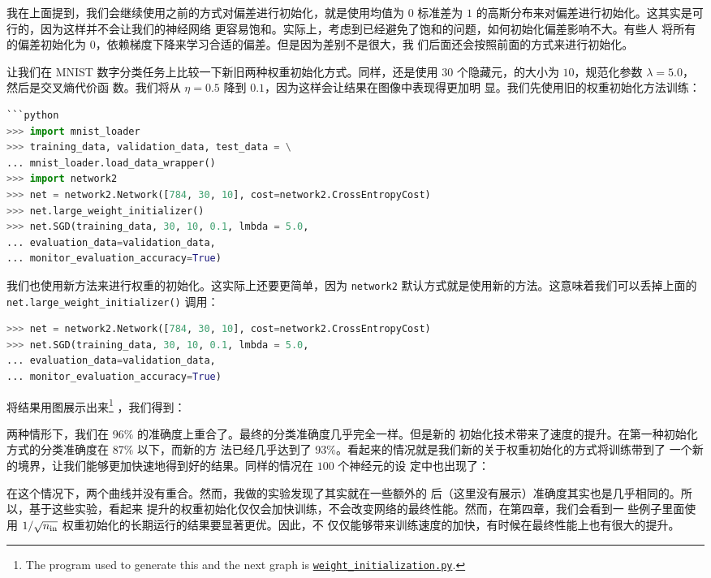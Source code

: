 我在上面提到，我们会继续使用之前的方式对偏差进行初始化，就是使用均值为 $0$ 标准差为
$1$ 的高斯分布来对偏差进行初始化。这其实是可行的，因为这样并不会让我们的神经网络
更容易饱和。实际上，考虑到已经避免了饱和的问题，如何初始化偏差影响不大。有些人
将所有的偏差初始化为 $0$，依赖梯度下降来学习合适的偏差。但是因为差别不是很大，我
们后面还会按照前面的方式来进行初始化。

让我们在 MNIST 数字分类任务上比较一下新旧两种权重初始化方式。同样，还是使用 $30$
个隐藏元，\minibatch 的大小为 $10$，规范化参数 $\lambda = 5.0$，然后是交叉熵代价函
数。我们将\learningrate{}从 $\eta=0.5$ 降到 $0.1$，因为这样会让结果在图像中表现得更加明
显。我们先使用旧的权重初始化方法训练：

\begin{lstlisting}[language=Python]
```python
>>> import mnist_loader
>>> training_data, validation_data, test_data = \
... mnist_loader.load_data_wrapper()
>>> import network2
>>> net = network2.Network([784, 30, 10], cost=network2.CrossEntropyCost)
>>> net.large_weight_initializer()
>>> net.SGD(training_data, 30, 10, 0.1, lmbda = 5.0,
... evaluation_data=validation_data,
... monitor_evaluation_accuracy=True)
\end{lstlisting}

我们也使用新方法来进行权重的初始化。这实际上还要更简单，因为
\lstinline!network2! 默认方式就是使用新的方法。这意味着我们可以丢掉上面的
\lstinline!net.large_weight_initializer()! 调用：

\begin{lstlisting}[language=Python]
>>> net = network2.Network([784, 30, 10], cost=network2.CrossEntropyCost)
>>> net.SGD(training_data, 30, 10, 0.1, lmbda = 5.0,
... evaluation_data=validation_data,
... monitor_evaluation_accuracy=True)
\end{lstlisting}

将结果用图展示出来\footnote{The program used to generate this and the next graph
  is
  \href{https://github.com/mnielsen/neural-networks-and-deep-learning/blob/master/fig/weight_initialization.py}{\lstinline!weight_initialization.py!}.}
，我们得到：

两种情形下，我们在 96\% 的准确度上重合了。最终的分类准确度几乎完全一样。但是新的
初始化技术带来了速度的提升。在第一种初始化方式的分类准确度在 87\% 以下，而新的方
法已经几乎达到了 93\%。看起来的情况就是我们新的关于权重初始化的方式将训练带到了
一个新的境界，让我们能够更加快速地得到好的结果。同样的情况在 $100$ 个神经元的设
定中也出现了：

在这个情况下，两个曲线并没有重合。然而，我做的实验发现了其实就在一些额外的%
\epochs{}后（这里没有展示）准确度其实也是几乎相同的。所以，基于这些实验，看起来
提升的权重初始化仅仅会加快训练，不会改变网络的最终性能。然而，在第四章，我们会看到一
些例子里面使用 $1/\sqrt{n_{\rm in}}$ 权重初始化的长期运行的结果要显著更优。因此，不
仅仅能够带来训练速度的加快，有时候在最终性能上也有很大的提升。

